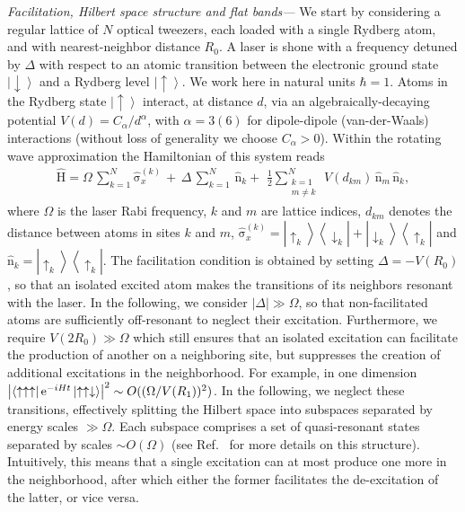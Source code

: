 \documentclass[prl,aps,twocolumn,showpacs,superscriptaddress,longbibliography]{revtex4-1}
\newcommand{\rme}[1]{{\rm{e}}^{#1}}
\newcommand{\lan}{\left\langle}
\newcommand{\ran}{\right\rangle}
\newcommand{\abs}[1]{\left| #1 \right|}
\newcommand{\ket}[1]{\left| #1 \ran}
\newcommand{\bra}[1]{\lan #1 \right|}
\newcommand{\proj}[1]{\ket{#1} \bra{#1}}
\newcommand{\up}{\uparrow}
\newcommand{\down}{\downarrow}
\newcommand{\op}[1]{\mathrm{\hat{#1}}}
\begin{document}
\emph{Facilitation, Hilbert space structure and flat bands---} We start by considering a regular \cite{footnote1} lattice of $N$ optical tweezers, each loaded with a single Rydberg atom, and with nearest-neighbor distance $R_0$. A laser is shone with a frequency detuned by $\Delta$ with respect to an atomic transition between the electronic ground state $\ket{\down}$ and a Rydberg level $\ket{\up}$. We work here in natural units $\hbar = 1$. Atoms in the Rydberg state $\ket{\up}$ interact, at distance $d$, via an algebraically-decaying potential $V(d) = C_\alpha / d^\alpha$, with $\alpha = 3 (6)$ for dipole-dipole (van-der-Waals) interactions (without loss of generality we choose $C_\alpha > 0$). Within the rotating wave approximation the Hamiltonian of this system reads
%
\begin{align}
 \op{H} = \Omega \, \sum_{k=1}^N  \op{\sigma}_x^{(k)} \, + \, \Delta\, \sum_{k=1}^N\,\op{n}_k +\,  \,
\frac{1}{2} \sum_{\substack{k= 1\\ m \ne k}}^N \, V(d_{km}) \, \op{n}_m\, \op{n}_k,
 \label{Eq:Hamil_full}
\end{align}
%
where $\Omega$ is the laser Rabi frequency, $k$ and $m$ are lattice indices, $d_{km}$ denotes the distance between atoms in sites $k$ and $m$, $\op{\sigma}_x^{(k)} = \ket{\up_k} \bra{\down_k} + \ket{\down_k} \bra{\up_k}$ and $\op{n}_k = \proj{\up_k}$. The facilitation condition is obtained by setting $\Delta = -V(R_0)$, so that an isolated excited atom makes the transitions of its neighbors resonant with the laser. In the following, we consider $\abs{\Delta} \gg \Omega$, so that non-facilitated atoms are sufficiently off-resonant to neglect their excitation. Furthermore, we require $V(2R_0) \gg \Omega$ which still ensures that an isolated excitation can facilitate the production of another on a neighboring site, but suppresses the creation of additional excitations in the neighborhood. For example, in one dimension $\abs{\bra{\up \up \up} \rme{-iHt} \ket{\up \up \down}}^2 \sim O((\Omega / V(R_1))^2)$. In the following, we neglect these transitions, effectively splitting the Hilbert space into subspaces separated by energy scales $\gg \Omega$. Each subspace comprises a set of quasi-resonant states separated by scales $\sim O(\Omega)$ (see Ref.~\cite{a_Marcuzzi_PRL_17} for more details on this structure). Intuitively, this means that a single excitation can at most produce one more in the neighborhood, after which either the former facilitates the de-excitation of the latter, or vice versa.
\end{document}
